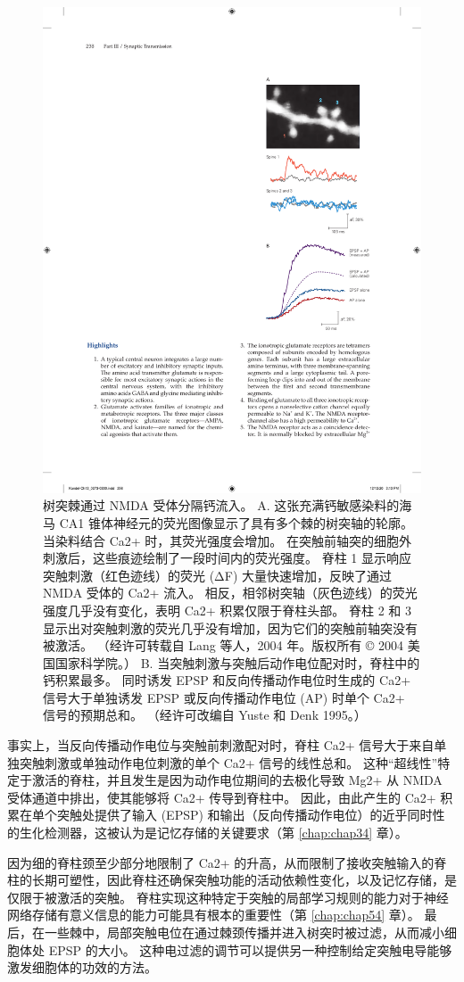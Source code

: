\begin{figure}[htbp]
	\centering
	\includegraphics[width=0.4\linewidth]{chap13/fig_13_18}
	\caption{树突棘通过 NMDA 受体分隔钙流入。 A. 这张充满钙敏感染料的海马 CA1 锥体神经元的荧光图像显示了具有多个棘的树突轴的轮廓。 当染料结合 Ca2+ 时，其荧光强度会增加。 在突触前轴突的细胞外刺激后，这些痕迹绘制了一段时间内的荧光强度。 脊柱 1 显示响应突触刺激（红色迹线）的荧光 (ΔF) 大量快速增加，反映了通过 NMDA 受体的 Ca2+ 流入。 相反，相邻树突轴（灰色迹线）的荧光强度几乎没有变化，表明 Ca2+ 积累仅限于脊柱头部。 脊柱 2 和 3 显示出对突触刺激的荧光几乎没有增加，因为它们的突触前轴突没有被激活。 （经许可转载自 Lang 等人，2004 年。版权所有 © 2004 美国国家科学院。） B. 当突触刺激与突触后动作电位配对时，脊柱中的钙积累最多。 同时诱发 EPSP 和反向传播动作电位时生成的 Ca2+ 信号大于单独诱发 EPSP 或反向传播动作电位 (AP) 时单个 Ca2+ 信号的预期总和。 （经许可改编自 Yuste 和 Denk 1995。）}
	\label{fig:13_18}
\end{figure}


事实上，当反向传播动作电位与突触前刺激配对时，脊柱 Ca2+ 信号大于来自单独突触刺激或单独动作电位刺激的单个 Ca2+ 信号的线性总和。
这种“超线性”特定于激活的脊柱，并且发生是因为动作电位期间的去极化导致 Mg2+ 从 NMDA 受体通道中排出，使其能够将 Ca2+ 传导到脊柱中。
因此，由此产生的 Ca2+ 积累在单个突触处提供了输入 (EPSP) 和输出（反向传播动作电位）的近乎同时性的生化检测器，这被认为是记忆存储的关键要求（第 \ref{chap:chap34} 章）。


因为细的脊柱颈至少部分地限制了 Ca2+ 的升高，从而限制了接收突触输入的脊柱的长期可塑性，因此脊柱还确保突触功能的活动依赖性变化，以及记忆存储，是 仅限于被激活的突触。
脊柱实现这种特定于突触的局部学习规则的能力对于神经网络存储有意义信息的能力可能具有根本的重要性（第 \ref{chap:chap54} 章）。
最后，在一些棘中，局部突触电位在通过棘颈传播并进入树突时被过滤，从而减小细胞体处 EPSP 的大小。
这种电过滤的调节可以提供另一种控制给定突触电导能够激发细胞体的功效的方法。



